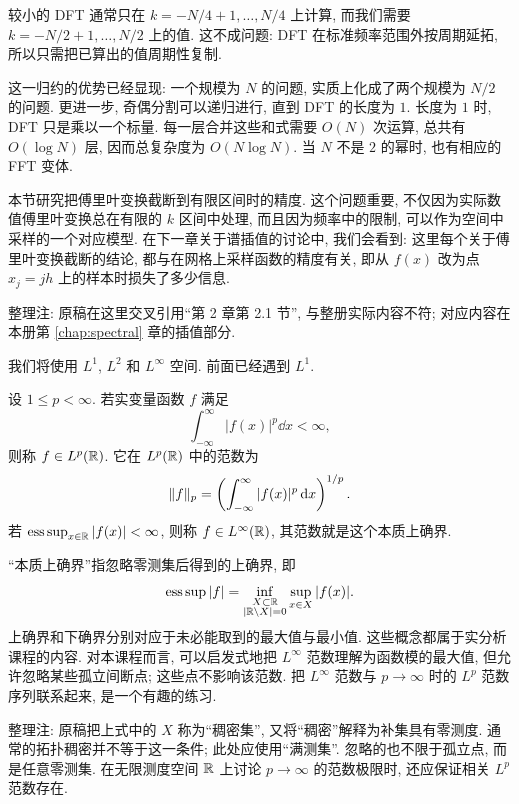 较小的 DFT 通常只在 $k=-N/4+1,\ldots,N/4$ 上计算, 而我们需要 $k=-N/2+1,\ldots,N/2$ 上的值. 这不成问题: DFT 在标准频率范围外按周期延拓, 所以只需把已算出的值周期性复制.

这一归约的优势已经显现: 一个规模为 $N$ 的问题, 实质上化成了两个规模为 $N/2$ 的问题. 更进一步, 奇偶分割可以递归进行, 直到 DFT 的长度为 $1$. 长度为 $1$ 时, DFT 只是乘以一个标量. 每一层合并这些和式需要 $O(N)$ 次运算, 总共有 $O(\log N)$ 层, 因而总复杂度为 $O(N\log N)$. 当 $N$ 不是 $2$ 的幂时, 也有相应的 FFT 变体.

\label{sec:smoothness-truncation}
本节研究把傅里叶变换截断到有限区间时的精度. 这个问题重要, 不仅因为实际数值傅里叶变换总在有限的 $k$ 区间中处理, 而且因为频率中的限制, 可以作为空间中采样的一个对应模型. 在下一章关于谱插值的讨论中, 我们会看到: 这里每个关于傅里叶变换截断的结论, 都与在网格上采样函数的精度有关, 即从 $f(x)$ 改为点 $x_j=jh$ 上的样本时损失了多少信息.
\begin{remark}
整理注: 原稿在这里交叉引用“第 2 章第 2.1 节”, 与整册实际内容不符; 对应内容在本册第 \ref{chap:spectral} 章的插值部分.
\end{remark}

我们将使用 $L^1$, $L^2$ 和 $L^\infty$ 空间. 前面已经遇到 $L^1$.

\begin{definition}[$L^p$ 空间]
设 $1\le p<\infty$. 若实变量函数 $f$ 满足
\[
\int_{-\infty}^{\infty}|f(x)|^p\dd x<\infty,
\]
则称 $f\in L^p(\mathbb R)$. 它在 $L^p(\mathbb R)$ 中的范数为
\[
\lVert f\rVert_p=\left(\int_{-\infty}^{\infty}|f(x)|^p\,\mathrm d x\right)^{1/p}.
\]
若 $\operatorname*{ess\,sup}_{x\in\mathbb R}|f(x)|<\infty$, 则称 $f\in L^\infty(\mathbb R)$, 其范数就是这个本质上确界.
\end{definition}

“本质上确界”指忽略零测集后得到的上确界, 即
\[
\operatorname*{ess\,sup}|f|
=\inf_{\substack{X\subset\mathbb R\\|\mathbb R\setminus X|=0}}
\sup_{x\in X}|f(x)|.
\]
上确界和下确界分别对应于未必能取到的最大值与最小值. 这些概念都属于实分析课程的内容. 对本课程而言, 可以启发式地把 $L^\infty$ 范数理解为函数模的最大值, 但允许忽略某些孤立间断点; 这些点不影响该范数. 把 $L^\infty$ 范数与 $p\to\infty$ 时的 $L^p$ 范数序列联系起来, 是一个有趣的练习.
\begin{remark}
整理注: 原稿把上式中的 $X$ 称为“稠密集”, 又将“稠密”解释为补集具有零测度. 通常的拓扑稠密并不等于这一条件; 此处应使用“满测集”. 忽略的也不限于孤立点, 而是任意零测集. 在无限测度空间 $\mathbb R$ 上讨论 $p\to\infty$ 的范数极限时, 还应保证相关 $L^p$ 范数存在.
\end{remark}

